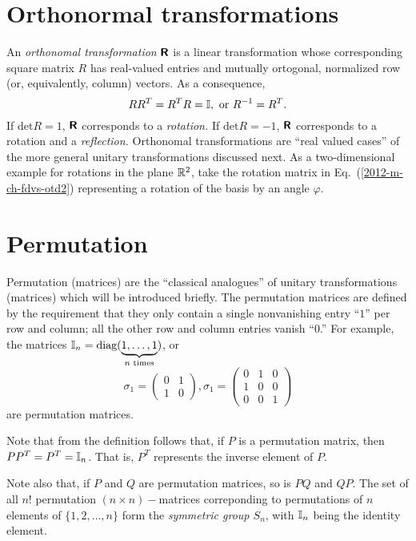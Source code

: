 \section{Orthonormal transformations}
An {\em orthonomal transformation} $\textsf{\textbf{R}}$ is a linear transformation
whose corresponding square matrix $R$ has real-valued entries
and mutually ortogonal, normalized row (or, equivalently, column) vectors.
As a consequence,
\begin{equation}
RR^T= R^TR= {\Bbb I}, \textrm{ or } R^{-1}=R^T .
\end{equation}
If $\textrm{det} R=1$, $\textsf{\textbf{R}}$ corresponds to a {\em rotation.}
If $\textrm{det} R=-1$, $\textsf{\textbf{R}}$ corresponds to a rotation and a {\em reflection.}
Orthonomal transformations are ``real valued cases'' of the more general unitary transformations discussed next.
As a  two-dimensional  example for rotations in the plane ${\Bbb R}^2$,
take the rotation matrix in Eq.~(\ref{2012-m-ch-fdvs-otd2})
representing a rotation of the basis by an angle $\varphi$.


\section{Permutation}

Permutation (matrices) are the ``classical analogues'' \cite{mermin-04,mermin-07}
of unitary transformations (matrices) which will be introduced briefly.
The permutation matrices are defined by the requirement that they only contain a single nonvanishing entry ``$1$'' per row and column;
all the other row and column entries vanish ``$0$.''
For example, the matrices ${\Bbb I}_n=\textrm{diag}(\underbrace{1,\ldots ,1}_{n \textrm{ times}})$,
or
$$
\sigma_1=
\begin{pmatrix}
0&1\\
1&0
\end{pmatrix} ,
\sigma_1=
\begin{pmatrix}
0&1&0\\
1&0&0\\
0&0&1
\end{pmatrix}
$$
are permutation matrices.

Note that from the definition follows that, if $P$ is a permutation matrix, then $PP^T=P^T={\Bbb I}_n$.
That is, $P^T$ represents the inverse element of $P$.

Note also that, if $P$ and $Q$ are permutation matrices, so is $PQ$ and $QP$.
The set of all $n!$
permutation $(n\times n)-$matrices correponding to permutations of $n$ elements of $\{ 1,2,\ldots ,n\}$ form the
{\em symmetric group $S_n$}, with ${\Bbb I}_n$ being the identity element.

